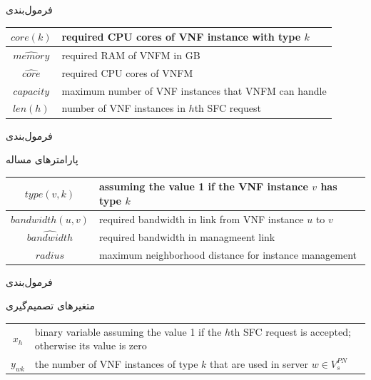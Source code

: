 \documentclass{beamer}
\begin{document}
\begin{persian}
\begin{frame}{فرمول‌بندی}
\begin{center}
\begin{latin}
\begin{tabular}{|c|p{5cm}|}
        \hline
        \(core(k)\) & required CPU cores of VNF instance with type \(k\) \\
        \hline
        \(\hat{memory}\) & required RAM of VNFM in GB \\
        \hline
        \(\hat{core}\) & required CPU cores of VNFM \\
        \hline
        \(capacity\) & maximum number of VNF instances that VNFM can handle \\
        \hline
        \(len(h)\) & number of VNF instances in \(h\)th SFC request \\
        \hline
    \end{tabular}\end{latin}\end{center}
\end{frame}
\begin{frame}{فرمول‌بندی} %
    \par پارامترهای مساله
    \begin{center}\begin{latin}\begin{tabular}{|c|p{5cm}|}
        \hline
        \(type(v, k)\) & assuming the value 1 if the VNF instance \(v\) has type \(k\)  \\
        \hline
        \(bandwidth(u, v)\) & required bandwidth in link from VNF instance \(u\) to \(v\) \\
        \hline
        \(\hat{bandwidth}\) & required bandwidth in managmeent link \\
        \hline
        \(radius\) & maximum neighborhood distance for instance management \\
        \hline
    \end{tabular}\end{latin}\end{center}
\end{frame}
\begin{frame}{فرمول‌بندی} %
    \par
    متغیرهای تصمیم‌گیری
    \begin{latin}\begin{tabular}{c p{10cm}}
        $x_h$ & binary variable assuming the value 1 if the $h$th SFC request is accepted; otherwise its value is zero \\
        $y_{wk}$ & the number of VNF instances of type $k$ that are used in server $w \in V_s^{PN}$ \\

\end{tabular}
\end{latin}
\end{frame}
\end{persian}
\end{document}
